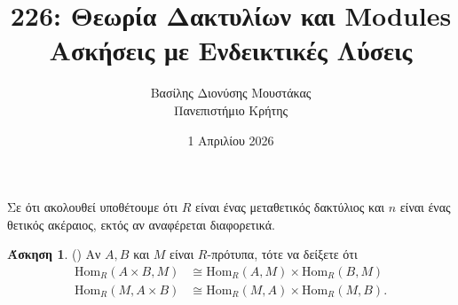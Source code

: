 \documentclass[12pt,a4paper,reqno]{amsart}
\title{226: Θεωρία Δακτυλίων και Modules \\ Ασκήσεις με Ενδεικτικές Λύσεις}
\author[Β.~Δ. Μουστακας]{Βασίλης Διονύσης Μουστάκας \\ Πανεπιστήμιο Κρήτης}
\date{1 Απριλίου 2026}
\theoremstyle{definition}
\newtheorem{exercise}{Άσκηση}
\newcommand{\Hom}{\mathrm{Hom}}
\begin{document}
\begingroup
\def\uppercasenonmath#1{} %
\let\MakeUppercase\relax %
\maketitle
\endgroup

\setcounter{exercise}{25}
\setcounter{equation}{4}
\renewcommand{\thesubsection}{\thesection.\arabic{subsection}}

Σε ότι ακολουθεί υποθέτουμε ότι $R$ είναι ένας μεταθετικός δακτύλιος και $n$ είναι ένας θετικός ακέραιος, εκτός αν αναφέρεται διαφορετικά.

\begin{exercise}{\rm(\cite[Άσκηση~10.3.12]{DF04})}
  \label{ex:DF_10.3.12}
  Αν $A, B$ και $M$ είναι $R$-πρότυπα, τότε να δείξετε ότι 
  \begin{align}
    \label{eq:10.3.12_a}
    \Hom_R(A\times{B},M) &\cong \Hom_R(A,M) \times \Hom_R(B,M)  \\
    \label{eq:10.3.12_b}
    \Hom_R(M,A\times{B}) &\cong \Hom_R(M,A) \times \Hom_R(M,B).
  \end{align}
\end{exercise}
\end{document}
